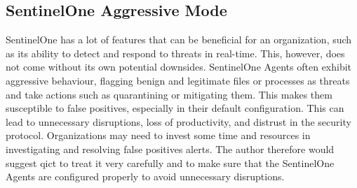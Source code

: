 \begin{multicols}{2}



  \subsection{SentinelOne Aggressive Mode}
  SentinelOne has a lot of features that can be beneficial for an organization, such as its ability to detect and respond to threats in real-time.
  This, however, does not come without its own potential downsides. SentinelOne Agents often exhibit aggressive behaviour, flagging benign and legitimate
  files or processes as threats and take actions such as quarantining or mitigating them. This makes them susceptible to false positives,
  especially in their default configuration. This can lead to unnecessary disruptions, loss of productivity, and distrust in the security protocol. Organizations
  may need to invest some time and resources in investigating and resolving false positives alerts. The author therefore would suggest \acrshort{qict} to
  treat it very carefully and to make sure that the SentinelOne Agents are configured properly to avoid unnecessary disruptions.


\end{multicols}
